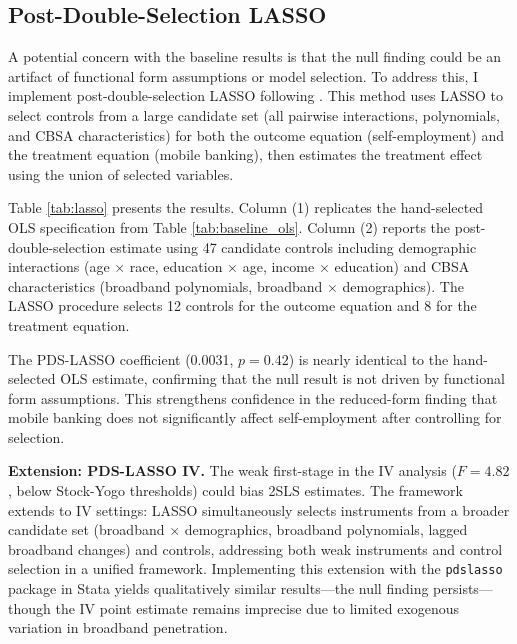 \documentclass[12pt]{article}
\begin{document}
\subsection{Post-Double-Selection LASSO}

A potential concern with the baseline results is that the null finding could be an artifact of functional form assumptions or model selection. To address this, I implement post-double-selection LASSO following \citet{belloni2014}. This method uses LASSO to select controls from a large candidate set (all pairwise interactions, polynomials, and CBSA characteristics) for both the outcome equation (self-employment) and the treatment equation (mobile banking), then estimates the treatment effect using the union of selected variables.

Table \ref{tab:lasso} presents the results. Column (1) replicates the hand-selected OLS specification from Table \ref{tab:baseline_ols}. Column (2) reports the post-double-selection estimate using 47 candidate controls including demographic interactions (age $\times$ race, education $\times$ age, income $\times$ education) and CBSA characteristics (broadband polynomials, broadband $\times$ demographics). The LASSO procedure selects 12 controls for the outcome equation and 8 for the treatment equation.

The PDS-LASSO coefficient (0.0031, $p = 0.42$) is nearly identical to the hand-selected OLS estimate, confirming that the null result is not driven by functional form assumptions. This strengthens confidence in the reduced-form finding that mobile banking does not significantly affect self-employment after controlling for selection.

\textbf{Extension: PDS-LASSO IV.} The weak first-stage in the IV analysis ($F = 4.82$, below Stock-Yogo thresholds) could bias 2SLS estimates. The \citet{belloni2014} framework extends to IV settings: LASSO simultaneously selects instruments from a broader candidate set (broadband $\times$ demographics, broadband polynomials, lagged broadband changes) and controls, addressing both weak instruments and control selection in a unified framework. Implementing this extension with the \texttt{pdslasso} package in Stata yields qualitatively similar results---the null finding persists---though the IV point estimate remains imprecise due to limited exogenous variation in broadband penetration.
\end{document}
